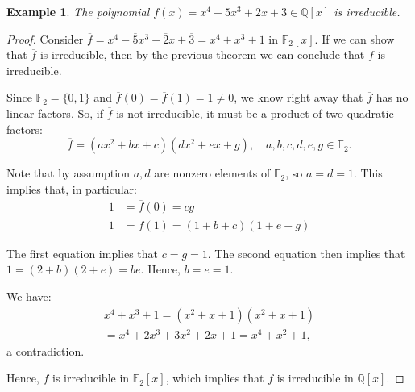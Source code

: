 \documentclass[a4paper,12pt]{report}
\newcommand{\ol}[1]{\overline{#1}}
\newcounter{statement}
\numberwithin{statement}{chapter}
\newtheorem{eg}[statement]{\bf Example}
\numberwithin{equation}{chapter}
\numberwithin{section}{chapter}
\numberwithin{subsection}{section}
\begin{document}
\begin{eg}
The polynomial $f(x) = x^4 - 5x^3 + 2x + 3 \in \mathbb{Q}[x]$ is irreducible.
\end{eg}
\begin{proof}

Consider $\ol{f} = x^4 -\ol{5}x^3 + \ol{2}x + \ol{3} = x^4 + x^3 + 1$ in $\mathbb{F}_2[x]$.
If we can show that $\ol{f}$ is irreducible, then by the previous theorem we can
conclude that $f$ is irreducible.





Since $\mathbb{F}_2 = \{0, 1\}$ and
$\ol{f}(0) = \ol{f}(1) = 1 \neq 0$, we know right away that $\ol{f}$
has no linear factors.  So, if $\ol{f}$ is not irreducible, it must be a product of two quadratic factors:
\[
\ol{f} = (ax^2 + bx + c)(dx^2 + ex + g),\quad a, b, c, d, e, g \in \mathbb{F}_2.
\]

Note that by assumption $a, d$ are nonzero elements of $\mathbb{F}_2$, so $a = d = 1$.
This implies that, in particular:
\[
\begin{split}
1 &= \ol{f}(0) = cg\\
1 &= \ol{f}(1) = (1 + b + c)(1 + e + g)
\end{split}
\]

The first equation implies that $c = g = 1$.
The second equation then implies that $1 = (2 + b)(2 + e) = be$.
Hence, $b = e = 1$.


We have:
\begin{multline*}
x^4 + x^3 +  1 = (x^2 + x + 1)(x^2 + x + 1)\\
 = x^4 + 2x^3 + 3x^2 + 2x + 1 = x^4 + x^2 + 1,
\end{multline*}
a contradiction.


Hence, $\ol{f}$ is irreducible in $\mathbb{F}_2[x]$, which implies
that $f$ is irreducible in $\mathbb{Q}[x]$.


\end{proof}
\end{document}
